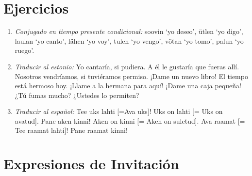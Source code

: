 \bigskip
\Large{\section*{Ejercicios}}

\begin{enumerate}
	\item \emph{Conjugado en tiempo presente condicional:} soovin `yo deseo', ütlen `yo digo', laulan `yo canto', lähen `yo voy', tulen `yo vengo', võtan `yo tomo', palun `yo ruego'.

	\item \emph{Traducir al estonio:} Yo cantaría, si pudiera. A él le gustaría que fueras allí. Nosotros vendríamos, si tuviéramos permiso. ¡Dame un nuevo libro! El tiempo está hermoso hoy. ¡Llame a la hermana para aquí! ¡Dame una caja pequeña! ¿Tú fumas mucho? ¿Ustedes lo permiten?

	\item \emph{Traducir al español:} Tee uks lahti [=Ava uks]! Uks on lahti [= Uks on avatud]. Pane aken kinni! Aken on kinni [= Aken on suletud]. Ava raamat [= Tee raamat lahti]! Pane raamat kinni!
\end{enumerate}

\bigskip
\Large{\section*{Expresiones de Invitación}}


